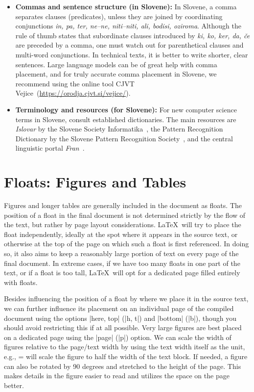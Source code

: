 \documentclass[9pt]{style/friteza}
\begin{document}
\begin{itemize}
    \item \textbf{Commas and sentence structure (in Slovene):} In Slovene, a comma separates clauses (predicates), unless they are joined by coordinating conjunctions \textit{in, pa, ter, ne--ne, niti--niti, ali, bodisi, oziroma}. Although the rule of thumb states that subordinate clauses introduced by \textit{ki, ko, ker, da, če} are preceded by a comma, one must watch out for parenthetical clauses and multi-word conjunctions. In technical texts, it is better to write shorter, clear sentences. Large language models can be of great help with comma placement, and for truly accurate comma placement in Slovene, we recommend using the online tool CJVT Vejice~(\url{https://orodja.cjvt.si/vejice/}).
    
    \item \textbf{Terminology and resources (for Slovene):} For new computer science terms in Slovene, consult established dictionaries. The main resources are \textit{Islovar} by the Slovene Society Informatika~\cite{Islovar}, the Pattern Recognition Dictionary by the Slovene Pattern Recognition Society~\cite{sdrv}, and the central linguistic portal \textit{Fran}~\cite{fran}.
\end{itemize}

\section{Floats: Figures and Tables}
\label{sec:plovke}

Figures and longer tables are generally included in the document as floats.
The position of a float in the final document is not determined strictly by the flow of the text, but rather by page layout considerations.
\LaTeX\ will try to place the float independently, ideally at the spot where it appears in the source text, or otherwise at the
top of the page on which such a float is first referenced.
In doing so, it also aims to keep a reasonably large portion of text on every page of the final document.
In extreme cases, if we have too many floats in one part of the text, or if a float is too tall, \LaTeX\ will opt for a dedicated page filled entirely with floats.

Besides influencing the position of a float by where we place it in the source text, we can further influence its placement on an individual page of the compiled document using the options \ltx|here, top| (\ltx|h, t|) and \ltx|bottom| (\ltx|b|), though you should avoid restricting this if at all possible. 
Very large figures are best placed on a dedicated page using the \ltx|page| (\ltx|p|) option.
We can scale the width of figures relative to the page/text width by using the text width itself as the unit, e.g., \textwidth= will scale the figure to half the width of the text block.
If needed, a figure can also be rotated by 90 degrees and stretched to the height of the page.
This makes details in the figure easier to read and utilizes the space on the page better.
\end{document}
